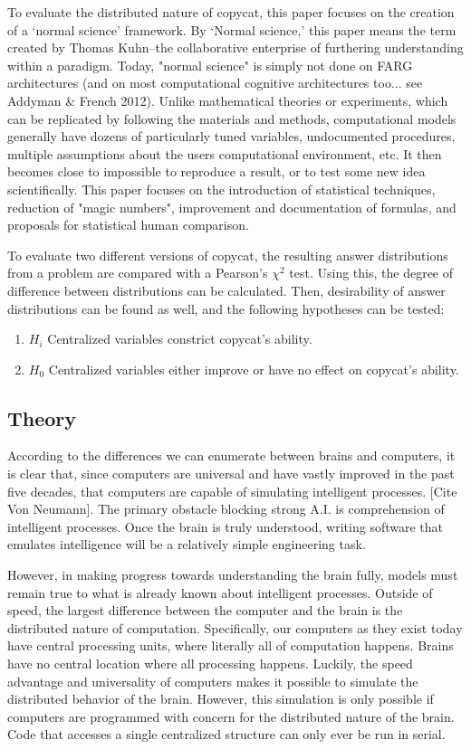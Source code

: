 \documentclass[a4paper]{article}
\begin{document}
To evaluate the distributed nature of copycat, this paper focuses on the creation of a `normal science' framework.
By `Normal science,' this paper means the term created by Thomas Kuhn--the collaborative enterprise of furthering understanding within a paradigm. 
Today, "normal science" is simply not done on FARG architectures (and on most computational cognitive architectures too... see Addyman \& French 2012). 
Unlike mathematical theories or experiments, which can be replicated by following the materials and methods, computational models generally have dozens of particularly tuned variables, undocumented procedures, multiple assumptions about the users computational environment, etc.
It then becomes close to impossible to reproduce a result, or to test some new idea scientifically. 
This paper focuses on the introduction of statistical techniques, reduction of "magic numbers", improvement and documentation of formulas, and proposals for statistical human comparison.

To evaluate two different versions of copycat, the resulting answer distributions from a problem are compared with a Pearson's $\chi^2$ test.
Using this, the degree of difference between distributions can be calculated.
Then, desirability of answer distributions can be found as well, and the following hypotheses can be tested:

\begin{enumerate}
    \item $H_i$ Centralized variables constrict copycat's ability.
    \item $H_0$ Centralized variables either improve or have no effect on copycat's ability.
\end{enumerate}

\subsection{Theory}

    According to the differences we can enumerate between brains and computers, it is clear that, since computers are universal and have vastly improved in the past five decades, that computers are capable of simulating intelligent processes. 
    [Cite Von Neumann]. 
    The primary obstacle blocking strong A.I. is comprehension of intelligent processes. 
    Once the brain is truly understood, writing software that emulates intelligence will be a relatively simple engineering task. 

    However, in making progress towards understanding the brain fully, models must remain true to what is already known about intelligent processes.
    Outside of speed, the largest difference between the computer and the brain is the distributed nature of computation. 
    Specifically, our computers as they exist today have central processing units, where literally all of computation happens. 
    Brains have no central location where all processing happens. 
    Luckily, the speed advantage and universality of computers makes it possible to simulate the distributed behavior of the brain. 
    However, this simulation is only possible if computers are programmed with concern for the distributed nature of the brain.
    Code that accesses a single centralized structure can only ever be run in serial.
\end{document}
